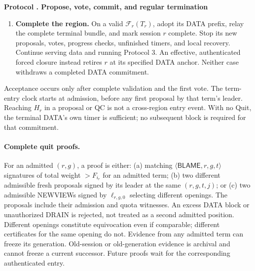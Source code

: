 \documentclass[11pt,a4paper]{article}
\newcommand{\RR}[1]{{\color{rrRed}#1}}
\newcommand{\FC}{\mathcal F}
\newcommand{\tagg}[1]{\ensuremath{\mathsf{#1}}}
\newcounter{protocol}
\newenvironment{protocol}[2]{\refstepcounter{protocol}\label{#1}
\begin{mdframed}[nobreak=true,linewidth=.6pt,skipabove=8pt,skipbelow=8pt,
innertopmargin=7pt,innerbottommargin=7pt]\small
\textbf{Protocol \theprotocol. #2}\par\smallskip}{\end{mdframed}}
\begin{document}
\begin{protocol}{alg:steady}{Propose, vote, commit, and regular termination}
\begin{enumerate}[label=\textbf{\arabic*)},itemsep=5pt]
\item \RR{\textbf{Complete the region.} On a valid $\FC_r(T_r)$, adopt
its DATA prefix, relay the complete terminal bundle, and mark session $r$
complete. Stop its new proposals, votes, progress checks, unfinished
timers, and local recovery. Continue serving data and running Protocol 3.
An effective, authenticated forced closure instead retires $r$ at its
specified DATA anchor. Neither case withdraws a completed DATA commitment.}
\end{enumerate}
\end{protocol}

Acceptance occurs only after complete validation and the first vote.
The term-entry clock starts at admission, before any first proposal by
that term's leader. Reaching $H_r$ in a proposal or QC is not a cross-region
entry event. With no Quit, the terminal DATA's own timer is sufficient;
no subsequent block is required for that commitment.

\paragraph{Complete quit proofs.}
For an admitted $(r,g)$, a proof is either: (a) matching
$\langle\tagg{BLAME},r,g,t\rangle$ signatures of total weight
$>F_{i_r}$ for an admitted term; (b) two different admissible fresh
proposals signed by its leader at the same $(r,g,t,j)$; or (c) two
admissible NEWVIEWs signed by $\ell_{r,g,0}$ selecting different openings.
The proposals include their admission and quota witnesses. An excess
DATA block or unauthorized DRAIN is rejected, not treated as a second
admitted position. Different openings constitute equivocation even if
comparable; different certificates for the same opening do not.
Evidence from any admitted term can freeze its generation. Old-session
or old-generation evidence is archival and cannot freeze a current
successor. Future proofs wait for the corresponding authenticated entry.
\end{document}
